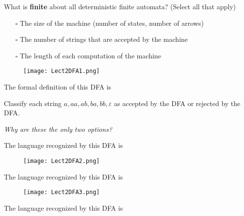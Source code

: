 \documentclass[12pt, oneside]{article}
\begin{document}
What is {\bf finite} about all deterministic finite automata? (Select all that apply)
\begin{itemize}
   \item[$\square$] The size of the machine (number of states, number of arrows)
   \item[$\square$] The number of strings that are accepted by the machine
   \item[$\square$] The length of each computation of the machine
\end{itemize}
  
\begin{figure}[h]
   \centering
   \texttt{[image: Lect2DFA1.png]} 
\end{figure}
   
The formal definition of this DFA is
   
\vspace{100pt}
   

Classify each string $a, aa, ab, ba, bb, \varepsilon$ as accepted by the DFA or rejected by the DFA.  

{\it Why are these the only two options?}

\vspace{200pt}


The language recognized by this DFA is
  
\vspace{100pt}
   

\begin{figure}[h]
  \centering
  \texttt{[image: Lect2DFA2.png]} 
\end{figure}
   

The language recognized by this DFA is
  
\vspace{100pt}

\begin{figure}[h]
    \centering
    \texttt{[image: Lect2DFA3.png]} 
\end{figure}

The language recognized by this DFA is
  
\vspace{100pt}
 \vfill
\end{document}
